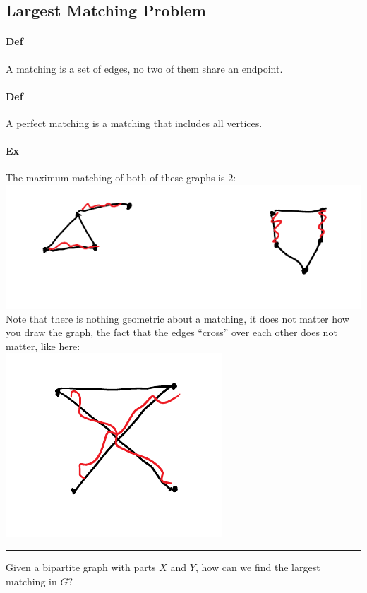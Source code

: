 \documentclass[12 pt]{article}
\begin{document}
        \subsection{Largest Matching Problem}
        \paragraph{Def}A matching is a set of edges, no two of them
        share an endpoint.
        \paragraph{Def} A perfect matching is a matching that includes
        all vertices.
        \paragraph{Ex} The maximum matching of both of these graphs is
        $2$:
        \\ \includegraphics[width=.9\textwidth]{i47.pdf}
        \\ Note that there is nothing geometric about a matching, it
        does not matter how you draw the graph, the fact that the
        edges ``cross'' over each other does not matter, like here:
        \\ \includegraphics[width=.7\textwidth]{i48.pdf}
        \\ \noindent \rule{\textwidth}{0.5pt}
        Given a bipartite graph with parts $X$ and $Y$, how can we
        find the largest matching in $G$?
\end{document}
